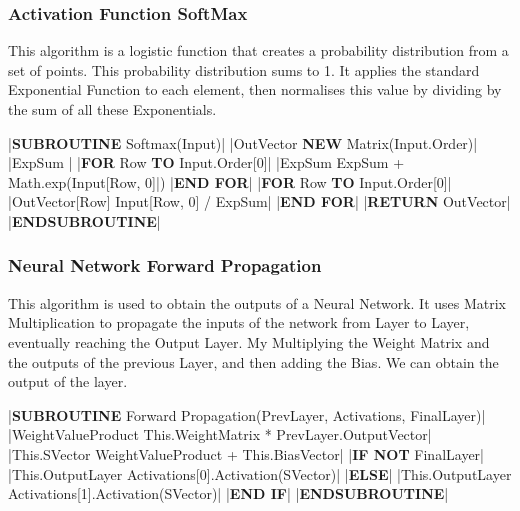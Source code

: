 \begin{flushleft}
                \vspace{0.5cm}
            \subsubsection{Activation Function SoftMax}
                This algorithm is a logistic function that creates a probability distribution from a set of points. This probability 
                distribution sums to 1. It applies the standard Exponential Function to each element, then normalises this value by dividing
                by the sum of all these Exponentials.

                \vspace{0.2cm}
                \begin{pseudocode}
|\textbf{SUBROUTINE} Softmax(Input)|
    |OutVector \leftarrow \textbf{NEW} Matrix(Input.Order)|
    |ExpSum |
    |\textbf{FOR} Row  \textbf{TO} Input.Order[0]|
        |ExpSum \leftarrow ExpSum + Math.exp(Input[Row, 0]|)
    |\textbf{END FOR}|
    |\textbf{FOR} Row  \textbf{TO} Input.Order[0]|
        |OutVector[Row] \leftarrow Input[Row, 0] / ExpSum|
    |\textbf{END FOR}|
    |\textbf{RETURN} OutVector|
|\textbf{ENDSUBROUTINE}|
                \end{pseudocode}

                \vspace{0.5cm}
            \subsubsection{Neural Network Forward Propagation}
                This algorithm is used to obtain the outputs of a Neural Network. It uses Matrix Multiplication to propagate the inputs
                of the network from Layer to Layer, eventually reaching the Output Layer. My Multiplying the Weight Matrix and the outputs
                of the previous Layer, and then adding the Bias. We can obtain the output of the layer.

                \vspace{0.2cm}
                \begin{pseudocode}
|\textbf{SUBROUTINE} Forward Propagation(PrevLayer, Activations, FinalLayer)|
    |WeightValueProduct \leftarrow This.WeightMatrix * PrevLayer.OutputVector|
    |This.SVector \leftarrow WeightValueProduct + This.BiasVector|
    |\textbf{IF NOT} FinalLayer|
        |This.OutputLayer \leftarrow Activations[0].Activation(SVector)|
    |\textbf{ELSE}|
        |This.OutputLayer \leftarrow Activations[1].Activation(SVector)|
    |\textbf{END IF}| 
|\textbf{ENDSUBROUTINE}|
                \end{pseudocode}


\end{flushleft}
